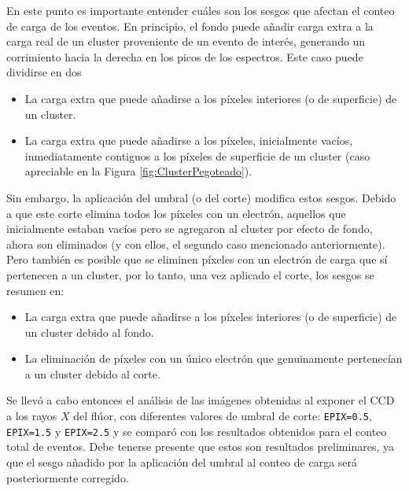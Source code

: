 En este punto es importante entender cuáles son los sesgos que afectan el conteo de carga de los eventos. En principio, el fondo puede añadir carga extra a la carga real de un cluster proveniente de un evento de interés, generando un corrimiento hacia la derecha en los picos de los espectros. Este caso puede dividirse en dos
\begin{itemize}
    \item La carga extra que puede añadirse a los píxeles interiores (o de superficie) de un cluster.
    \item La carga extra que puede añadirse a los píxeles, inicialmente vacíos, inmediatamente contiguos a los píxeles de superficie de un cluster (caso apreciable en la Figura \ref{fig:ClusterPegoteado}).
\end{itemize}

Sin embargo, la aplicación del umbral (o del corte) modifica estos sesgos. Debido a que este corte elimina todos los píxeles con un electrón, aquellos que inicialmente estaban vacíos pero se agregaron al cluster por efecto de fondo, ahora son eliminados (y con ellos, el segundo caso mencionado anteriormente). Pero también es posible que se eliminen píxeles con un electrón de carga que sí pertenecen a un cluster, %
por lo tanto, una vez aplicado el corte, los sesgos se resumen en:
\begin{itemize}
    \item La carga extra que puede añadirse a los píxeles interiores (o de superficie) de un cluster debido al fondo.
    \item La eliminación de píxeles con un único electrón que genuinamente pertenecían a un cluster debido al corte.
\end{itemize}

Se llevó a cabo entonces el análisis de las imágenes obtenidas al exponer el CCD a los rayos $X$ del flúor, con diferentes valores de umbral de corte: \verb|EPIX=0.5|, \verb|EPIX=1.5| y \verb|EPIX=2.5| y se comparó con los resultados obtenidos para el conteo total de eventos. 
Debe tenerse presente que estos son resultados preliminares, ya que el sesgo añadido por la aplicación del umbral al conteo de carga será posteriormente corregido.

